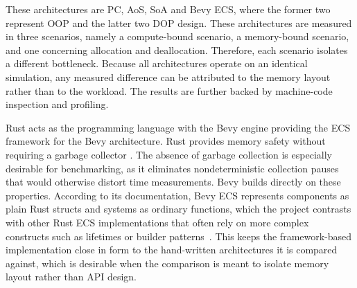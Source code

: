 These architectures are \ac{PC}, \ac{AoS}, \ac{SoA} and Bevy ECS, where the former two represent \ac{OOP} and the latter two \ac{DOP} design. These architectures are measured in three scenarios, namely a compute-bound scenario, a memory-bound scenario, and one concerning allocation and deallocation. Therefore, each scenario isolates a different bottleneck. Because all architectures operate on an identical simulation, any measured difference can be attributed to the memory layout rather than to the workload. The results are further backed by machine-code inspection and profiling. 

Rust acts as the programming language with the Bevy engine providing the \ac{ECS} framework for the Bevy architecture. Rust provides memory safety without requiring a garbage collector \cite{klabnik2023rust}. The absence of garbage collection is especially desirable for benchmarking, as it eliminates nondeterministic collection pauses that would otherwise distort time measurements. Bevy builds directly on these properties. According to its documentation, Bevy ECS represents components as plain Rust structs and systems as ordinary functions, which the project contrasts with other Rust ECS implementations that often rely on more complex constructs such as lifetimes or builder patterns~\cite{bevy_quickstart_ecs}. This keeps the framework-based implementation close in form to the hand-written architectures it is compared against, which is desirable when the comparison is meant to isolate memory layout rather than API design.


\acresetall
